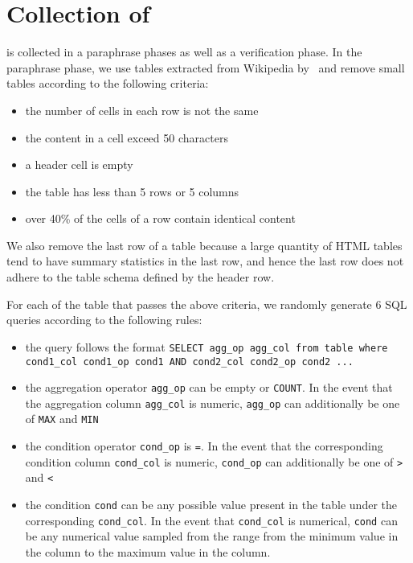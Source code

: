 \section{Collection of \dataset}
\label{section:data_collection}

\dataset is collected in a paraphrase phases as well as a verification phase.
In the paraphrase phase, we use tables extracted from Wikipedia by~\citet{Bhagavatula2013MethodsFE} and remove small tables according to the following criteria:

\begin{itemize}
\item the number of cells in each row is not the same
\item the content in a cell exceed 50 characters
\item a header cell is empty
\item the table has less than 5 rows or 5 columns
\item over 40\% of the cells of a row contain identical content
\end{itemize}


We also remove the last row of a table because a large quantity of HTML tables tend to have summary statistics in the last row, and hence the last row does not adhere to the table schema defined by the header row.

For each of the table that passes the above criteria, we randomly generate 6 SQL queries according to the following rules:

\begin{itemize}
\item the query follows the format \texttt{SELECT agg\_op agg\_col from table where cond1\_col cond1\_op cond1 AND cond2\_col cond2\_op cond2 ...}
\item the aggregation operator \texttt{agg\_op} can be empty or \texttt{COUNT}. In the event that the aggregation column \texttt{agg\_col} is numeric, \texttt{agg\_op} can additionally be one of \texttt{MAX} and \texttt{MIN}
\item the condition operator \texttt{cond\_op} is \texttt{=}. In the event that the corresponding condition column \texttt{cond\_col} is numeric, \texttt{cond\_op} can additionally be one of \texttt{>} and \texttt{<}
\item the condition \texttt{cond} can be any possible value present in the table under the corresponding \texttt{cond\_col}. In the event that \texttt{cond\_col} is numerical, \texttt{cond} can be any numerical value sampled from the range from the minimum value in the column to the maximum value in the column.
\end{itemize}

